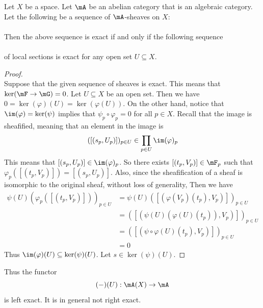 \documentclass[a4paper]{article}
\begin{document}
\begin{prp}{}{} Let $X$ be a space. Let $\mA$ be an abelian category that is an algebraic category. Let the following be a sequence of $\mA$-sheaves on $X$: \\
\\
Then the above sequence is exact if and only if the following sequence \\
\\
of local sections is exact for any open set $U\subseteq X$. 
\begin{proof}\\
Suppose that the given sequence of sheaves is exact. This means that $\ker(\mF\to\mG)=0$. Let $U\subseteq X$ be an open set. Then we have $0=\ker(\varphi)(U)=\ker(\varphi(U))$. On the other hand, notice that $\im(\varphi)=\ker(\psi)$ implies that $\psi_p\circ\varphi_p=0$ for all $p\in X$. Recall that the image is sheafified, meaning that an element in the image is $$([(s_p,U_p)])_{p\in U}\in\prod_{p\in U}\im(\varphi)_p$$ This means that $[(s_p,U_p)]\in\im(\varphi)_p$. So there exists $[(t_p,V_p)]\in\mF_p$ such that $\varphi_p([(t_p,V_p)])=[(s_p,U_p)]$. Also, since the sheafification of a sheaf is isomorphic to the original sheaf, without loss of generality, Then we have 
\begin{align*}
\psi(U)\left(\varphi_p([(t_p,V_p)])\right)_{p\in U}&=\psi(U)\left([(\varphi(V_p)(t_p),V_p)]\right)_{p\in U}\\
&=\left([(\psi(U)(\varphi(U)(t_p)),V_p)]\right)_{p\in U}\\
&=\left([(\psi\circ\varphi(U)(t_p),V_p)]\right)_{p\in U}\\
&=0
\end{align*}
Thus $\im(\varphi)(U)\subseteq\ker(\psi)(U)$. Let $s\in\ker(\psi)(U)$. 
\end{proof}
\end{prp}

Thus the functor $$(-)(U):\mA(X)\to\mA$$ is left exact. It is in general not right exact. 
\end{document}
